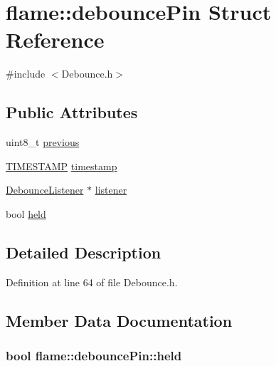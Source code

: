 \hypertarget{structflame_1_1debounce_pin}{\section{flame\-:\-:debounce\-Pin Struct Reference}
\label{structflame_1_1debounce_pin}
}


{\ttfamily \#include $<$Debounce.\-h$>$}

\subsection*{Public Attributes}
\begin{DoxyCompactItemize}
\item 
uint8\-\_\-t \hyperlink{structflame_1_1debounce_pin_af3f18f9d280894adfcf12294b296c108}{previous}
\item 
\hyperlink{namespaceflame_ad90347e9ea7e54907966260ec5c7d22f}{T\-I\-M\-E\-S\-T\-A\-M\-P} \hyperlink{structflame_1_1debounce_pin_ad10be4149c4882c6e767ad3460b6a5c9}{timestamp}
\item 
\hyperlink{classflame_1_1_debounce_listener}{Debounce\-Listener} $\ast$ \hyperlink{structflame_1_1debounce_pin_a9af0c2b0919f7876d1c1826aca106bc6}{listener}
\item 
bool \hyperlink{structflame_1_1debounce_pin_a2c160c5a6d6902bada1dc1a9a0591e5c}{held}
\end{DoxyCompactItemize}


\subsection{Detailed Description}


Definition at line 64 of file Debounce.\-h.



\subsection{Member Data Documentation}
\hypertarget{structflame_1_1debounce_pin_a2c160c5a6d6902bada1dc1a9a0591e5c}{
\subsubsection[{held}]{\setlength{\rightskip}{0pt plus 5cm}bool flame\-::debounce\-Pin\-::held}}\label{structflame_1_1debounce_pin_a2c160c5a6d6902bada1dc1a9a0591e5c}


